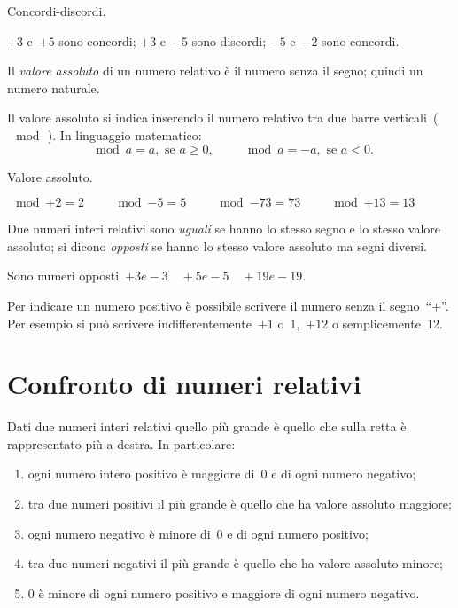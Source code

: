  \begin{esempio}{}{}
 Concordi-discordi.
 
\(+3\) e~\(+5\) sono concordi; \quad 
\(+3\) e~\(-5\) sono discordi; \quad 
\(-5\) e~\(-2\) sono concordi.
\end{esempio}

\begin{definizione}{}{}
Il \emph{valore assoluto} di un numero relativo è il numero senza il segno; 
quindi un numero naturale.
\end{definizione}

Il valore assoluto si indica inserendo il numero relativo tra due barre 
verticali~(\(\mod{\,}\)). In linguaggio
matematico:
\[ \mod{a}=a,\text{ se }a\ge0,\qquad \mod{a}=-a,\text{ se }a<0.\]
 \begin{esempio}{}{}
 Valore assoluto.
 
\(\mod{+2}=2 \qquad \mod{-5}=5 \qquad 
 \mod{-73}=73 \qquad \mod{+13}=13\)
 \end{esempio}

\begin{definizione}{}{}
 Due numeri interi relativi sono \emph{uguali} se hanno lo stesso segno e 
lo 
stesso valore assoluto;
 si dicono \emph{opposti} se hanno lo stesso valore assoluto ma segni 
diversi.
\end{definizione}

Sono numeri opposti~\(+3 e -3 \quad +5 e -5 \quad +19 e -19\).

\begin{osservazione}{}{} Per indicare un numero positivo è possibile scrivere 
il 
numero 
senza il segno~``\(+\)''.
Per esempio si può scrivere indifferentemente~\(+1\) o~1,~\(+12\) o 
semplicemente~12.
\end{osservazione}

\section{Confronto di numeri relativi}
\label{sec:int_confronto}

Dati due numeri interi relativi quello più grande è quello che sulla retta 
è 
rappresentato più a destra.
In particolare:
 \begin{enumerate} [label=(\alph*)]
 \item ogni numero intero positivo è maggiore di~0 e di ogni numero 
negativo;
 \item tra due numeri positivi il più grande è quello che ha valore 
assoluto 
maggiore;
 \item ogni numero negativo è minore di~0 e di ogni numero positivo;
 \item tra due numeri negativi il più grande è quello che ha valore 
assoluto 
minore;
 \item 0 è minore di ogni numero positivo e maggiore di ogni numero 
negativo.
 \end{enumerate}

